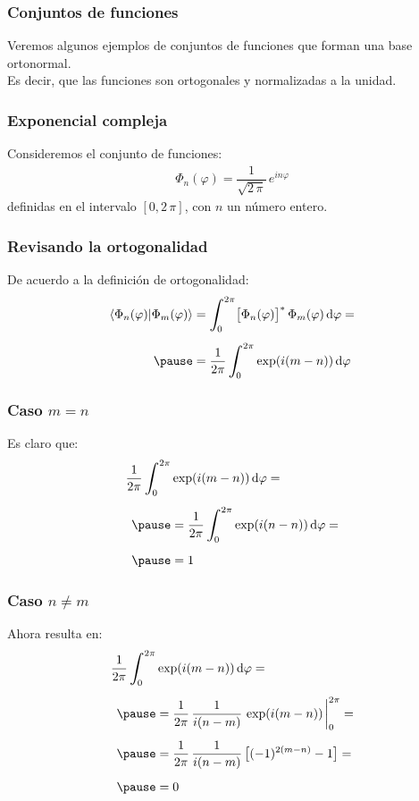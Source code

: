 \documentclass[12pt]{beamer}
\begin{document}
\begin{frame}
\frametitle{Conjuntos de funciones}
Veremos algunos ejemplos de conjuntos de funciones que forman una base ortonormal.
\\
\bigskip
Es decir, que las funciones son ortogonales y normalizadas a la unidad.
\end{frame}
\begin{frame}
\frametitle{Exponencial compleja}
Consideremos el conjunto de funciones:
\pause
\begin{align}
\Phi_{n} (\varphi) = \dfrac{1}{\sqrt{2 \, \pi}} \, e^{i n \varphi}
\label{eq:ecuacion_06_67}
\end{align}
definidas en el intervalo $[0, 2 \, \pi]$, con $n$ un número entero.
\end{frame}
\begin{frame}
\frametitle{Revisando la ortogonalidad}
De acuerdo a la definición de ortogonalidad:
\pause
\begin{eqnarray}
\begin{aligned}[b]
\braket{\Phi_{n}(\varphi)}{\Phi_{m}(\varphi)} &= \scaleint{6ex}_{\bs 0}^{2 \pi} \big[ \Phi_{n}(\varphi) \big]^{*} \, \Phi_{m}(\varphi) \dd{\varphi} = \\[0.5em] \pause
&= \dfrac{1}{2 \pi} \, \scaleint{6ex}_{\bs 0}^{2 \pi} \exp(i (m - n)) \dd{\varphi}
\end{aligned}
\label{eq:ecuacion_06_68}
\end{eqnarray}
\end{frame}
\begin{frame}
\frametitle{Caso $m = n$}
Es claro que:
\pause
\begin{eqnarray}
\begin{aligned}[b]
\dfrac{1}{2 \pi} \, \scaleint{6ex}_{\bs 0}^{2 \pi} &\exp(i (m - n)) \dd{\varphi} =  \\[0.5em] \pause
&= \dfrac{1}{2 \pi} \, \scaleint{6ex}_{\bs 0}^{2 \pi} \exp(i (n - n)) \dd{\varphi} = \\[0.5em] \pause
&= 1
\end{aligned}
\label{eq:ecuacion:06_70}
\end{eqnarray}
\end{frame}
\begin{frame}
\frametitle{Caso $n \neq m$}
Ahora resulta en:
\pause
\begin{eqnarray}
\begin{aligned}[b]
\dfrac{1}{2 \pi} \, \scaleint{6ex}_{\bs 0}^{2 \pi} &\exp(i (m - n)) \dd{\varphi} = \\[0.5em] \pause
&= \dfrac{1}{2 \pi} \, \dfrac{1}{i(n -m)} \, \exp(i (m - n)) \eval_{0}^{2 \pi} = \\[0.5em] \pause
&= \dfrac{1}{2 \pi} \, \dfrac{1}{i(n -m)} \, \big[ (-1)^{2 (m-n)} - 1 \big] = \\[0.5em] \pause
&= 0
\end{aligned}
\label{eq:ecuacion:06_69}
\end{eqnarray}
\end{frame}
\end{document}
